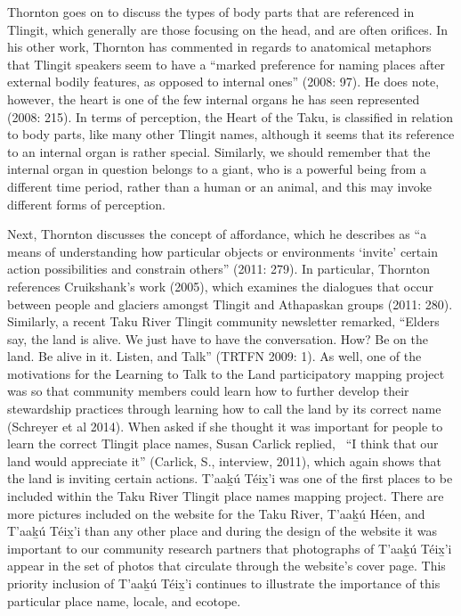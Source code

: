 Thornton goes on to discuss the types of body parts that are referenced in Tlingit, which generally are those focusing on the head, and are often orifices. In his other work, Thornton has commented in regards to anatomical metaphors that Tlingit speakers seem to have a “marked preference for naming places after external bodily features, as opposed to internal ones” (2008: 97). He does note, however, the heart is one of the few internal organs he has seen represented (2008: 215). In terms of perception, the Heart of the Taku, is classified in relation to body parts, like many other Tlingit names, although it seems that its reference to an internal organ is rather special. Similarly, we should remember that the internal organ in question belongs to a giant, who is a powerful being from a different time period, rather than a human or an animal, and this may invoke different forms of perception.

Next, Thornton discusses the concept of affordance, which he describes as “a means of understanding how particular objects or environments ‘invite’ certain action possibilities and constrain others” (2011: 279). In particular, Thornton references Cruikshank’s work (2005), which examines the dialogues that occur between people and glaciers amongst Tlingit and Athapaskan groups (2011: 280). Similarly, a recent Taku River Tlingit community newsletter remarked, “Elders say, the land is alive. We just have to have the conversation. How? Be on the land. Be alive in it. Listen, and Talk” (TRTFN 2009: 1). As well, one of the motivations for the Learning to Talk to the Land participatory mapping project was so that community members could learn how to further develop their stewardship practices through learning how to call the land by its correct name (Schreyer et al 2014). When asked if she thought it was important for people to learn the correct Tlingit place names, Susan Carlick replied, \ “I think that our land would appreciate it” (Carlick, S., interview, 2011), which again shows that the land is inviting certain actions. T'aak̲ú Téix̲'i was one of the first places to be included within the Taku River Tlingit place names mapping project. There are more pictures included on the website for the Taku River, T'aak̲ú Héen, and T'aak̲ú Téix̲'i than any other place and during the design of the website it was important to our community research partners that photographs of T'aak̲ú Téix̲'i appear in the set of photos that circulate through the website’s cover page. This priority inclusion of T'aak̲ú Téix̲'i continues to illustrate the importance of this particular place name, locale, and ecotope.

